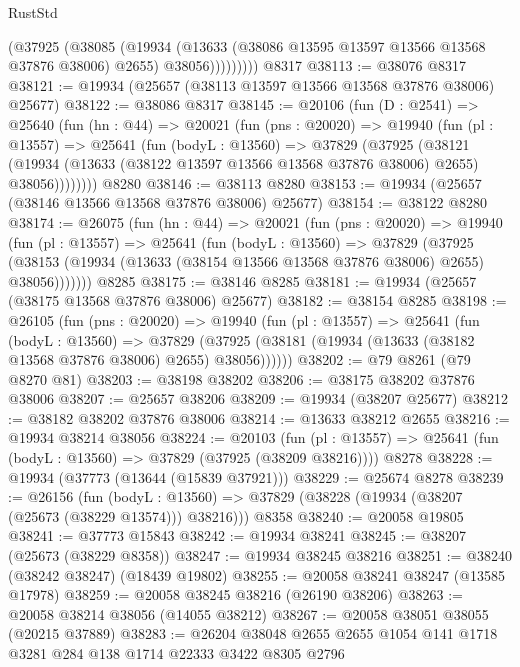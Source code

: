 \begin{lexlean}{RustStd}
\begin{coremodule}
                (@37925
                  (@38085
                    (@19934
                      (@13633 (@38086 @13595 @13597 @13566 @13568 @37876 @38006) @2655)
                      @38056)))))))))
    @8317
@38113 := @38076 @8317
@38121 := @19934 (@25657 (@38113 @13597 @13566 @13568 @37876 @38006) @25677)
@38122 := @38086 @8317
@38145 := @20106
    (fun (D : @2541) =>
    @25640
      (fun (hn : @44) =>
      @20021
        (fun (pns : @20020) =>
        @19940
          (fun (pl : @13557) =>
          @25641
            (fun (bodyL : @13560) =>
            @37829
              (@37925
                (@38121
                  (@19934 (@13633 (@38122 @13597 @13566 @13568 @37876 @38006) @2655) @38056))))))))
    @8280
@38146 := @38113 @8280
@38153 := @19934 (@25657 (@38146 @13566 @13568 @37876 @38006) @25677)
@38154 := @38122 @8280
@38174 := @26075
    (fun (hn : @44) =>
    @20021
      (fun (pns : @20020) =>
      @19940
        (fun (pl : @13557) =>
        @25641
          (fun (bodyL : @13560) =>
          @37829
            (@37925
              (@38153 (@19934 (@13633 (@38154 @13566 @13568 @37876 @38006) @2655) @38056)))))))
    @8285
@38175 := @38146 @8285
@38181 := @19934 (@25657 (@38175 @13568 @37876 @38006) @25677)
@38182 := @38154 @8285
@38198 := @26105
    (fun (pns : @20020) =>
    @19940
      (fun (pl : @13557) =>
      @25641
        (fun (bodyL : @13560) =>
        @37829 (@37925 (@38181 (@19934 (@13633 (@38182 @13568 @37876 @38006) @2655) @38056))))))
@38202 := @79 @8261 (@79 @8270 @81)
@38203 := @38198 @38202
@38206 := @38175 @38202 @37876 @38006
@38207 := @25657 @38206
@38209 := @19934 (@38207 @25677)
@38212 := @38182 @38202 @37876 @38006
@38214 := @13633 @38212 @2655
@38216 := @19934 @38214 @38056
@38224 := @20103
    (fun (pl : @13557) => @25641 (fun (bodyL : @13560) => @37829 (@37925 (@38209 @38216))))
    @8278
@38228 := @19934 (@37773 (@13644 (@15839 @37921)))
@38229 := @25674 @8278
@38239 := @26156
    (fun (bodyL : @13560) => @37829 (@38228 (@19934 (@38207 (@25673 (@38229 @13574))) @38216)))
    @8358
@38240 := @20058 @19805
@38241 := @37773 @15843
@38242 := @19934 @38241
@38245 := @38207 (@25673 (@38229 @8358))
@38247 := @19934 @38245 @38216
@38251 := @38240 (@38242 @38247) (@18439 @19802)
@38255 := @20058 @38241 @38247 (@13585 @17978)
@38259 := @20058 @38245 @38216 (@26190 @38206)
@38263 := @20058 @38214 @38056 (@14055 @38212)
@38267 := @20058 @38051 @38055 (@20215 @37889)
@38283 := @26204
    @38048
    @2655
    @2655
    @1054
    @141
    @1718
    @3281
    @284
    @138
    @1714
    @22333
    @3422
    @8305
    @2796

\end{coremodule}
\end{lexlean}

